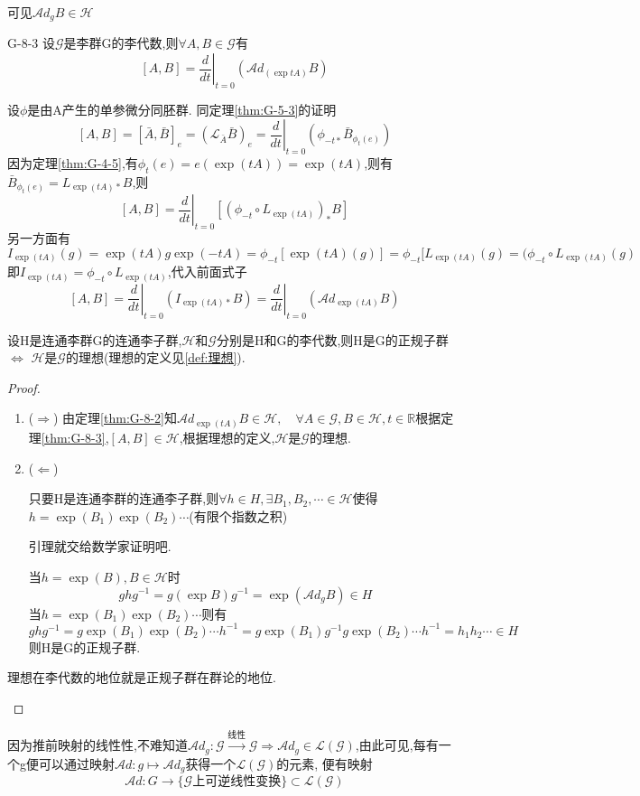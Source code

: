 \documentclass[../main.tex]{subfiles}
\begin{document}
可见$\mathscr{A}\!d_gB \in \mathscr{H}$
\begin{theorem}{}{G-8-3}
	设$\mathscr{G}$是李群G的李代数,则$\forall A,B \in \mathscr{G}$有$$
		[A,B] = \left.\frac{d}{dt}\right|_{t=0} (\mathscr{A}\!d_{(\exp tA)}B)$$
\end{theorem}
设$\phi$是由A产生的单参微分同胚群.
同定理\ref{thm:G-5-3}的证明$$
	[A,B] = [\bar{A},\bar{B}]_e = (\mathscr{L}_{\bar{A}}\bar{B})_e = \left.\frac{d}{dt}\right|_{t=0}(\phi_{-t*}\bar{B}_{\phi_{t}(e)})$$
因为定理\ref{thm:G-4-5},有$\phi_t(e) = e (\exp(tA)) = \exp(tA)$,则有$\bar{B}_{\phi_t(e)} = L_{\exp(tA)*}B$,则$$
	[A,B] = \left.\frac{d}{dt}\right|_{t=0}[(\phi_{-t} \circ L_{\exp(tA)})_{*}B]$$
另一方面有$$
	I_{\exp (tA)}(g) = \exp(tA) g \exp(-tA) = \phi_{-t}[\exp (tA)(g)] = \phi_{-t}[L_{\exp(tA)}(g) = (\phi_{-t}\circ L_{\exp(tA)}(g)$$
即$I_{\exp(tA)} = \phi_{-t}\circ L_{\exp (tA)}$,代入前面式子$$
	[A,B] = \left.\frac{d}{dt}\right|_{t=0}(I_{\exp(tA)*}B) = \left.\frac{d}{dt}\right|_{t=0}(\mathscr{A}\!d_{\exp(tA)}B)$$
\begin{theorem}
	设H是连通李群G的连通李子群,$\mathscr{H}$和$\mathscr{G}$分别是H和G的李代数,则H是G的正规子群$\Leftrightarrow$ $\mathscr{H}$是$\mathscr{G}$的理想(理想的定义见\ref{def:理想}).
\end{theorem}
\begin{proof}
	\begin{enumerate}
		\item ($\Rightarrow$) 由定理\ref{thm:G-8-2}知$\mathscr{A}\!d_{\exp(tA)}B \in \mathscr{H},\quad \forall A \in \mathscr{G} ,B\in \mathscr{H}, t \in \mathbb{R}$根据定理\ref{thm:G-8-3},$[A,B] \in \mathscr{H}$,根据理想的定义,$\mathscr{H}$是$\mathscr{G}$的理想.
		\item ($\Leftarrow$) \begin{lemma}
			      只要H是连通李群的连通李子群,则$\forall h \in H,\exists B_1,B_2,\cdots \in \mathscr{H}$使得$h = \exp(B_1)\exp(B_2)\cdots$(有限个指数之积)
		      \end{lemma}引理就交给数学家证明吧.

		      当$h = \exp(B),B\in \mathscr{H}$时$$
			      ghg^{-1} = g(\exp{B})g^{-1} = \exp(\mathscr{A}\!d_gB) \in H$$当$h = \exp(B_1) \exp(B_2) \cdots$则有$$
			      ghg^{-1} = g\exp(B_1) \exp(B_2)\cdots h^{-1} = g\exp(B_1) g^{-1}g\exp(B_2)\cdots h^{-1} = h_1 h_2 \cdots \in H$$则H是G的正规子群.
	\end{enumerate}
	\begin{note}
		理想在李代数的地位就是正规子群在群论的地位.
	\end{note}
\end{proof}
因为推前映射的线性性,不难知道$\mathscr{A}\!d_g:\mathscr{G}\xrightarrow{\text{线性}} \mathscr{G} \Rightarrow \mathscr{A}\!d_g\in \mathscr{L}(\mathscr{G})$,由此可见,每有一个g便可以通过映射$\mathscr{A}\!d:g\mapsto \mathscr{A}\!d_g$获得一个$\mathscr{L}(\mathscr{G})$的元素,
便有映射$$
	\mathscr{A}\!d:G\rightarrow \{\mathscr{G}\text{上可逆线性变换}\} \subset \mathscr{L}(\mathscr{G})$$
\end{document}
